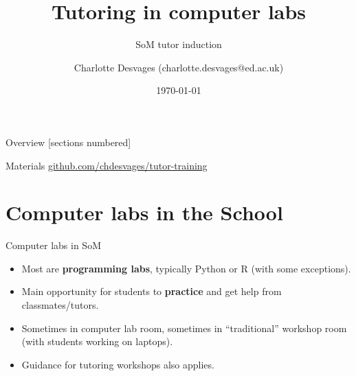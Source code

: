 \documentclass[10pt]{beamer}
\title{Tutoring in computer labs}
\subtitle{SoM tutor induction}
\date{\today}
\author{Charlotte Desvages (charlotte.desvages@ed.ac.uk)}
\institute{School of Mathematics}
\begin{document}

\maketitle

\begin{frame}{Overview}
  [sections numbered]
  \tableofcontents%
\end{frame}

\begin{frame}{Materials}
    \url{github.com/chdesvages/tutor-training}
\end{frame}

\section{Computer labs in the School}

\begin{frame}[fragile]{Computer labs in SoM}

    \begin{itemize}[<+->]
        \item Most are \textbf{programming labs}, typically Python or R (with some exceptions).
        \item Main opportunity for students to \textbf{practice} and get help from classmates/tutors.
        \item Sometimes in computer lab room, sometimes in ``traditional'' workshop room (with students working on laptops).
        \item Guidance for tutoring workshops also applies.
    \end{itemize}

\end{frame}
\end{document}
